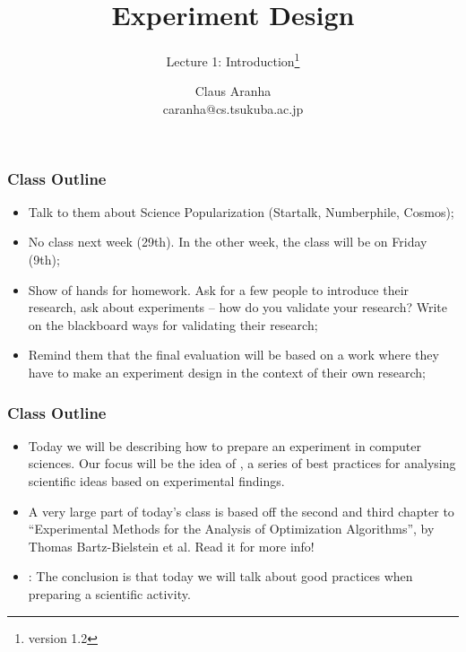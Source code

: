 \documentclass{beamer}
\title[]{Experiment Design}
\subtitle[]{Lecture 1: Introduction\footnote{version 1.2}}
\author[Claus Aranha]{Claus Aranha\\{\footnotesize caranha@cs.tsukuba.ac.jp}}
\institute{Department of Computer Science}
\begin{document}
\begin{frame}
  \tableofcontents
\end{frame}

\begin{frame}
  \frametitle{Class Outline}
  \begin{itemize}
  \item {} Talk to them about Science
    Popularization (Startalk, Numberphile, Cosmos);
  \item {} No class next week (29th). In the
    other week, the class will be on Friday (9th);
  \item {} Show of hands for homework. Ask for a
    few people to introduce their research, ask about experiments --
    how do you validate your research? Write on the blackboard ways
    for validating their research;
  \item {} Remind them that the final evaluation
    will be based on a work where they have to make an experiment
    design in the context of their own research;
  \end{itemize}
\end{frame}

\begin{frame}
  \frametitle{Class Outline}
  \begin{itemize}
  \item {} Today we will
    be describing how to prepare an experiment in computer
    sciences. Our focus will be the idea of , a series of best practices for analysing
    scientific ideas based on experimental findings.
  \item {} A very large part of today's class
    is based off the second and third chapter to ``Experimental
    Methods for the Analysis of Optimization Algorithms'', by Thomas
    Bartz-Bielstein et al. Read it for more info!
  \item {}: The conclusion is
    that today we will talk about good practices when preparing a
    scientific activity.
  \end{itemize}
\end{frame}
\end{document}
